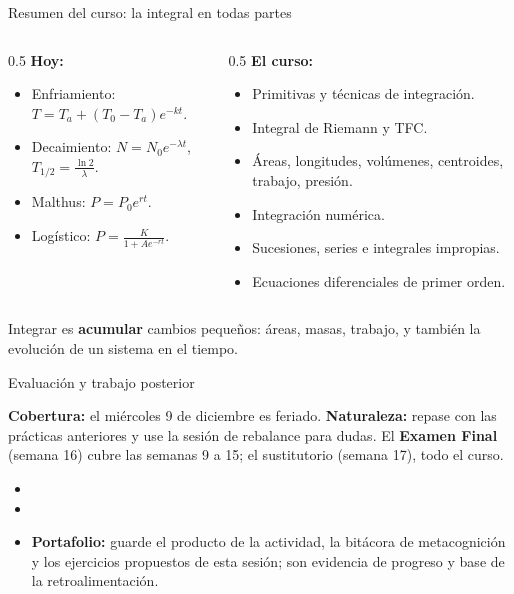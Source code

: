 \documentclass[10pt,aspectratio=169]{beamer}
\begin{document}
\begin{frame}{Resumen del curso: la integral en todas partes}
  \begin{columns}[t]
    \begin{column}{0.5\textwidth}
      \textbf{Hoy:}
      \begin{itemize}
        \item Enfriamiento: $T=T_a+(T_0-T_a)e^{-kt}$.
        \item Decaimiento: $N=N_0e^{-\lambda t}$, \ $T_{1/2}=\frac{\ln2}\lambda$.
        \item Malthus: $P=P_0e^{rt}$.
        \item Logístico: $P=\frac{K}{1+Ae^{-rt}}$.
      \end{itemize}
    \end{column}
    \begin{column}{0.5\textwidth}
      \textbf{El curso:}
      \begin{itemize}
        \item Primitivas y técnicas de integración.
        \item Integral de Riemann y TFC.
        \item Áreas, longitudes, volúmenes, centroides, trabajo, presión.
        \item Integración numérica.
        \item Sucesiones, series e integrales impropias.
        \item Ecuaciones diferenciales de primer orden.
      \end{itemize}
    \end{column}
  \end{columns}
  \vspace{3mm}
  \begin{idea}
    Integrar es \textbf{acumular} cambios pequeños: áreas, masas, trabajo, y también la evolución de un sistema en el tiempo.
  \end{idea}
\end{frame}


\begin{frame}{Evaluación y trabajo posterior}
  \small
  \begin{evalbox}
    \textbf{Cobertura:} el miércoles 9 de diciembre es feriado. \textbf{Naturaleza:} repase con las prácticas anteriores y use la sesión de rebalance para dudas. El \textbf{Examen Final} (semana 16) cubre las semanas 9 a 15; el sustitutorio (semana 17), todo el curso.
  \end{evalbox}
  \begin{itemize}
    \item \criterios
    \item \declaracionia
    \item \textbf{Portafolio:} guarde el producto de la actividad, la bitácora de metacognición y los ejercicios propuestos de esta sesión; son evidencia de progreso y base de la retroalimentación.
  \end{itemize}
\end{frame}
\end{document}
